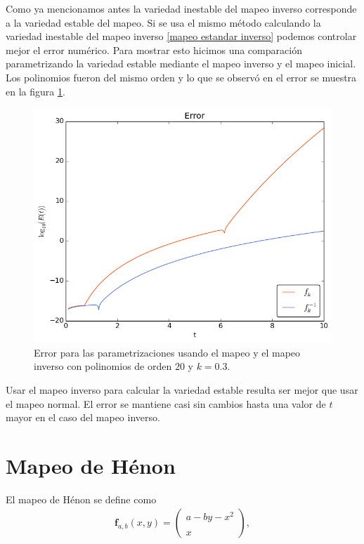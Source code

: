 Como ya mencionamos antes la variedad inestable del mapeo inverso corresponde a la variedad estable del mapeo. Si se usa el mismo método calculando la variedad inestable del mapeo inverso \eqref{mapeo estandar inverso} podemos controlar mejor el error numérico. Para mostrar esto hicimos una comparación parametrizando la variedad estable mediante el mapeo inverso y el mapeo inicial. Los polinomios fueron del mismo orden y lo que se observó en el error se muestra en la figura \ref{erroresinverso}.


\begin{figure}[H]
\centering
\includegraphics[scale=0.6]{mapeoinver}
\caption{Error para las parametrizaciones usando el mapeo y el mapeo inverso con polinomios de orden $20$ y $k=0.3$. }
\label{erroresinverso}
\end{figure}

Usar el mapeo inverso para calcular la variedad estable resulta ser mejor que usar el mapeo normal. El error se mantiene casi sin cambios hasta una valor de $t$ mayor en el caso del mapeo inverso. 




\label{henon-seccion}\section{Mapeo de Hénon}
El mapeo de Hénon se define como \cite{devaney}
\begin{eqnarray}
\mathbf{f}_{a,b}(x,y)=\left( \begin{array}{lcc}
             a-by-x^{2}\\
             \\ x
             \end{array}
             \right), \label{Henon}
\end{eqnarray}

